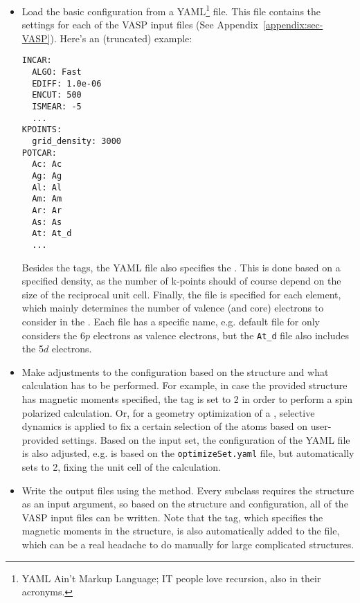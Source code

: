 \begin{refsection}
\begin{itemize}
\item Load the basic configuration from a YAML\footnote{YAML Ain't Markup 
Language; IT people love recursion, also in their acronyms.} file. This file 
contains the settings for each of the \gls{VASP} input files (See 
Appendix~\ref{appendix:sec-VASP}). Here's an (truncated) example: 
\begin{verbatim} 
INCAR: 
  ALGO: Fast 
  EDIFF: 1.0e-06 
  ENCUT: 500 
  ISMEAR: -5 
  ... 
KPOINTS: 
  grid_density: 3000 
POTCAR: 
  Ac: Ac 
  Ag: Ag 
  Al: Al 
  Am: Am 
  Ar: Ar 
  As: As 
  At: At_d 
  ... 
\end{verbatim} 
Besides the  tags, the YAML file also specifies the 
. This is done based on 
a specified density, as the number of k-points should of course depend on the 
size of the reciprocal unit cell. Finally, the  file is specified 
for each element, which mainly determines the number of valence (and core) 
electrons to consider in the . Each 
 file has a specific name, e.g. default file for  only 
considers the 6$p$ electrons as valence electrons, but the \texttt{At\_d} file 
also includes the 5$d$ electrons. 
 
\item Make adjustments to the configuration based on the structure and what 
calculation has to be performed. For example, in case the provided structure 
has magnetic moments specified, the  tag is set to 2 in order to 
perform a spin polarized calculation. Or, for a geometry optimization of a 
, selective dynamics is applied to fix a 
certain selection of the atoms based on user-provided settings. Based on the 
input set, the configuration of the YAML file is also adjusted, e.g. 
 is based on the \texttt{optimizeSet.yaml} file, but 
automatically sets  to 2, fixing the unit cell of the calculation. 
 
\item Write the output files using the  method. Every 
 subclass requires the structure as an input argument, so based 
on the structure and configuration, all of the \gls{VASP} input files can 
be written. Note that the  tag, which specifies the magnetic 
moments in the structure, is also automatically added to the  
file, which can be a real headache to do manually for large complicated 
structures. 
 

\end{itemize}
\end{refsection}
